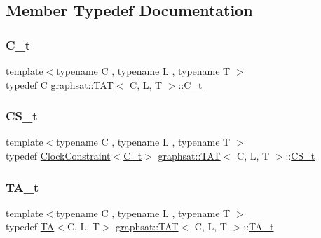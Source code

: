 \subsection{Member Typedef Documentation}
\mbox{\label{classgraphsat_1_1_t_a_t_ace8284b3c7a4cbf6cb5527368243342d}} 
\subsubsection{\texorpdfstring{C\_t}{C\_t}}
{\footnotesize\ttfamily template$<$typename C , typename L , typename T $>$ \\
typedef C \mbox{\hyperlink{classgraphsat_1_1_t_a_t}{graphsat\+::\+T\+AT}}$<$ C, L, T $>$\+::\mbox{\hyperlink{classgraphsat_1_1_t_a_t_ace8284b3c7a4cbf6cb5527368243342d}{C\+\_\+t}}\hspace{0.3cm}{\ttfamily [private]}}

\mbox{\label{classgraphsat_1_1_t_a_t_a0268b3d54214d8cc91b0bca9a961daa0}} 
\subsubsection{\texorpdfstring{CS\_t}{CS\_t}}
{\footnotesize\ttfamily template$<$typename C , typename L , typename T $>$ \\
typedef \mbox{\hyperlink{classgraphsat_1_1_clock_constraint}{Clock\+Constraint}}$<$\mbox{\hyperlink{classgraphsat_1_1_t_a_t_ace8284b3c7a4cbf6cb5527368243342d}{C\+\_\+t}}$>$ \mbox{\hyperlink{classgraphsat_1_1_t_a_t}{graphsat\+::\+T\+AT}}$<$ C, L, T $>$\+::\mbox{\hyperlink{classgraphsat_1_1_t_a_t_a0268b3d54214d8cc91b0bca9a961daa0}{C\+S\+\_\+t}}\hspace{0.3cm}{\ttfamily [private]}}

\mbox{\label{classgraphsat_1_1_t_a_t_a0936ee5b3b460c37d9b2a850d17a0844}} 
\subsubsection{\texorpdfstring{TA\_t}{TA\_t}}
{\footnotesize\ttfamily template$<$typename C , typename L , typename T $>$ \\
typedef \mbox{\hyperlink{classgraphsat_1_1_t_a}{TA}}$<$C, L, T$>$ \mbox{\hyperlink{classgraphsat_1_1_t_a_t}{graphsat\+::\+T\+AT}}$<$ C, L, T $>$\+::\mbox{\hyperlink{classgraphsat_1_1_t_a_t_a0936ee5b3b460c37d9b2a850d17a0844}{T\+A\+\_\+t}}\hspace{0.3cm}{\ttfamily [private]}}

